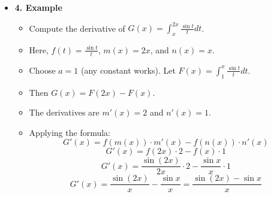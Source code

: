 \begin{cascade}
\begin{itemize}
		\item
		      \textbf{4. Example}
		      \begin{itemize}
			      \item Compute the derivative of $G(x) = \int_x^{2x} \frac{\sin t}{t} dt$.
			      \item Here, $f(t) = \frac{\sin t}{t}$, $m(x) = 2x$, and $n(x) = x$.
			      \item Choose $a=1$ (any constant works). Let $F(x) = \int_1^x \frac{\sin t}{t} dt$.
			      \item Then $G(x) = F(2x) - F(x)$.
			      \item The derivatives are $m'(x) = 2$ and $n'(x) = 1$.
			      \item Applying the formula:
			            \[ G'(x) = f(m(x)) \cdot m'(x) - f(n(x)) \cdot n'(x) \]
			            \[ G'(x) = f(2x) \cdot 2 - f(x) \cdot 1 \]
			            \[ G'(x) = \frac{\sin(2x)}{2x} \cdot 2 - \frac{\sin x}{x} \cdot 1 \]
			            \[ G'(x) = \frac{\sin(2x)}{x} - \frac{\sin x}{x} = \frac{\sin(2x) - \sin x}{x} \]
		      \end{itemize}
	\end{itemize}
\end{cascade}

\hfill

